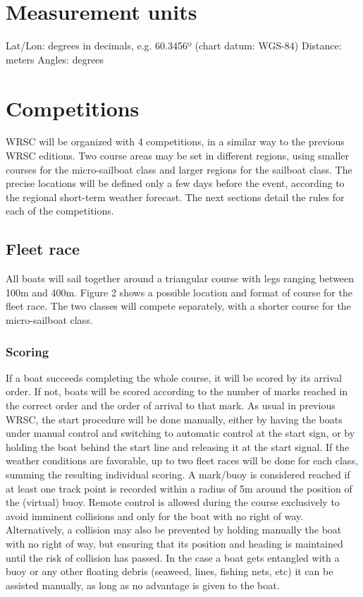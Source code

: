 \documentclass[12pt]{article}
\begin{document}
\section{Measurement units}
Lat/Lon: degrees in decimals, e.g. 60.3456º (chart datum: WGS-84)
Distance: meters
Angles: degrees

\section{Competitions}
WRSC will be organized with 4 competitions, in a similar way to the previous
WRSC editions.
Two course areas may be set in different regions, using smaller courses for the
micro-sailboat
class and larger regions for the sailboat class. The precise locations will be
defined only a few
days before the event, according to the regional short-term weather forecast.
The next sections
detail the rules for each of the competitions.

\subsection{Fleet race}

All boats will sail together around a triangular course with legs ranging
between 100m and
400m. Figure 2 shows a possible location and format of course for the fleet
race. The two
classes will compete separately, with a shorter course for the micro-sailboat
class.
\subsubsection{Scoring}

If a boat succeeds completing the whole course, it will be scored by its arrival
order. If not,
boats will be scored according to the number of marks reached in the correct
order and the
order of arrival to that mark. As usual in previous WRSC, the start procedure
will be done
manually, either by having the boats under manual control and switching to
automatic control
at the start sign, or by holding the boat behind the start line and releasing it
at the start signal.
If the weather conditions are favorable, up to two fleet races will be done for
each class,
summing the resulting individual scoring. A mark/buoy is considered reached if
at least one
track point is recorded within a radius of 5m around the position of the
(virtual) buoy.
Remote control is allowed during the course exclusively to avoid imminent
collisions and only
for the boat with no right of way. Alternatively, a collision may also be
prevented by holding
manually the boat with no right of way, but ensuring that its position and
heading is maintained
until the risk of collision has passed. In the case a boat gets entangled with a
buoy or any other
floating debris (seaweed, lines, fishing nets, etc) it can be assisted manually,
as long as no
advantage is given to the boat.
\end{document}
